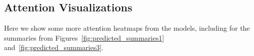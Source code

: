 \documentclass[12pt]{report}
\begin{document}
\begin{appendices}
\chapter{Attention Visualizations}
\label{appendix:attn}

Here we show some more attention heatmaps from the models, including for the summaries from Figures~\ref{fig:predicted_summaries1} and~\ref{fig:predicted_summaries3}.

%
%
%
%
%
%
%

\end{appendices}
\end{document}

